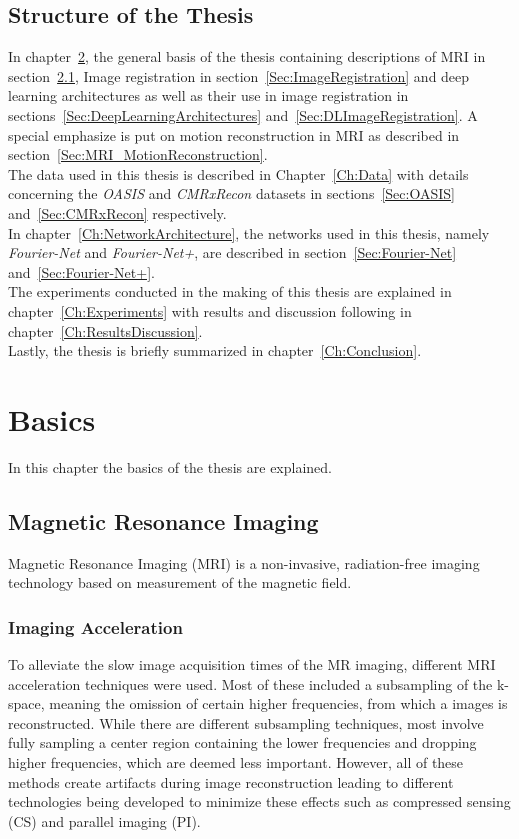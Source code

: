 \documentclass[english,version-2022-01]{uzl-thesis} %
\begin{document}
\section{Structure of the Thesis} \label{Sec:Structure}
In chapter~\ref{Ch:Basics}, the general basis of the thesis containing descriptions of MRI in section~\ref{Sec:MRI}, Image registration in section~\ref{Sec:ImageRegistration} and deep learning architectures as well as their use in image registration in sections~\ref{Sec:DeepLearningArchitectures} and~\ref{Sec:DLImageRegistration}. A special emphasize is put on motion reconstruction in MRI as described in section~\ref{Sec:MRI_MotionReconstruction}.\\
The data used in this thesis is described in Chapter~\ref{Ch:Data} with details concerning the \emph{OASIS} and \emph{CMRxRecon} datasets in sections~\ref{Sec:OASIS} and~\ref{Sec:CMRxRecon} respectively.\\
In chapter~\ref{Ch:NetworkArchitecture}, the networks used in this thesis, namely \emph{Fourier-Net} and \emph{Fourier-Net+}, are described in section~\ref{Sec:Fourier-Net} and~\ref{Sec:Fourier-Net+}.\\
The experiments conducted in the making of this thesis are explained in chapter~\ref{Ch:Experiments} with results and discussion following in chapter~\ref{Ch:ResultsDiscussion}.\\
Lastly, the thesis is briefly summarized in chapter~\ref{Ch:Conclusion}.


\chapter{Basics}	\label{Ch:Basics}
In this chapter the basics of the thesis are explained.

\section{Magnetic Resonance Imaging} \label{Sec:MRI}
Magnetic Resonance Imaging (MRI) is a non-invasive, radiation-free imaging technology based on measurement of the magnetic field.

\subsection{Imaging Acceleration}
To alleviate the slow image acquisition times of the MR imaging, different MRI acceleration techniques were used. Most of these included a subsampling of the k-space, meaning the omission of certain higher frequencies, from which a images is reconstructed. While there are different subsampling techniques, most involve fully sampling a center region containing the lower frequencies and dropping higher frequencies, which are deemed less important. However, all of these methods create artifacts during image reconstruction leading to different technologies being developed to minimize these effects such as compressed sensing (CS) and parallel imaging (PI).
\end{document}
